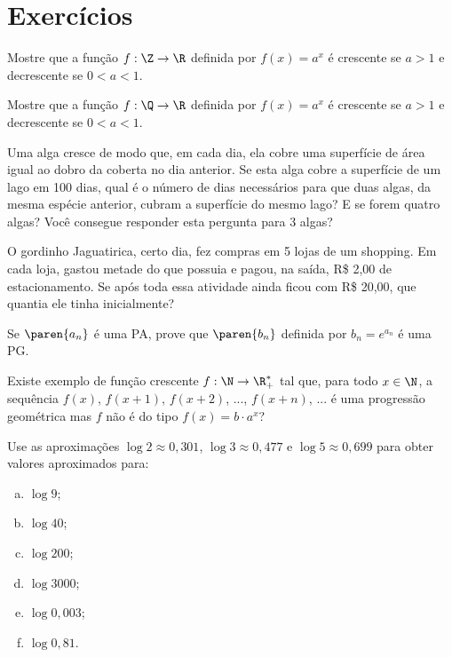 \section{Exercícios}

\begin{exercise}
    Mostre que a função $f: \Z \to \R$ definida por $f(x)=a^x$ é
crescente se $a>1$ e decrescente se $0<a<1$.
\end{exercise}

\begin{exercise}
    Mostre que a função $f: \Q \to \R$ definida por $f(x)=a^x$ é
crescente se $a>1$ e decrescente se $0<a<1$.
\end{exercise}

\begin{exercise}
    Uma alga cresce de modo que, em cada dia, ela cobre uma
superfície de área igual ao dobro da coberta no dia anterior. Se
esta alga cobre a superfície de um lago em 100 dias, qual é o número
de dias necessários para que duas algas, da mesma espécie anterior,
cubram a superfície do mesmo lago? E se forem quatro algas? Você
consegue responder esta pergunta para 3 algas?
\end{exercise}

\begin{exercise}
    O gordinho Jaguatirica, certo dia, fez compras em 5 lojas de um
shopping. Em cada loja, gastou metade do que possuia e pagou, na
saída, R\$ 2{,}00 de estacionamento. Se após toda essa atividade
ainda ficou com R\$ 20{,}00, que quantia ele tinha inicialmente?
\end{exercise}

\begin{exercise}
    Se $\paren{a_n}$ é uma PA, prove que $\paren{ b_n}$ definida por
$b_n = e^{a_n}$ é uma PG.
\end{exercise}

\begin{exercise}
    Existe exemplo de função crescente $f : \N \to \R_+^\ast$ tal
que, para todo $x \in \N$, a sequência $f(x)$, $f(x+1)$, $f(x+2)$,
..., $f(x+n)$, ... é uma progressão geométrica mas $f$ não é do tipo
$f(x) = b \cdot a^x$?
\end{exercise}

\begin{exercise}
    Use as aproximações $\log 2 \approx 0,301$, $\log 3 \approx
0,477$ e $\log 5 \approx 0,699$ para obter valores aproximados para:
\begin{enumerate}[(a)]
  \item $\log 9$;
  \item $\log 40$;
  \item $\log 200$;
  \item $\log 3000$;
  \item $\log 0{,}003$;
  \item $\log 0{,}81$.
\end{enumerate}
\end{exercise}

